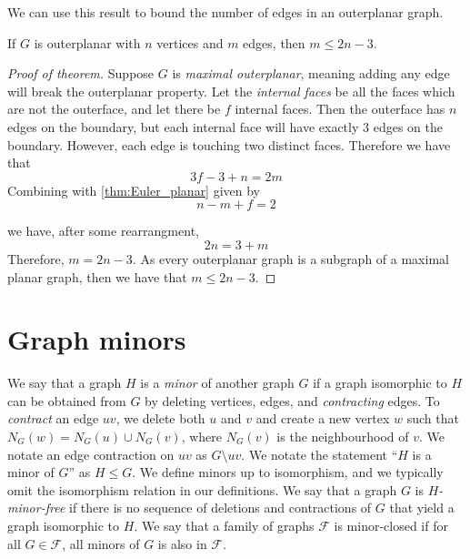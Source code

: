 We can use this result to bound the number of edges in an outerplanar graph.
\begin{theorem}\label{thm:outerplanar_bound}
	If $G$ is outerplanar with $n$ vertices and $m$ edges, then $m \leq 2n - 3$.
\end{theorem}

\begin{proof}[Proof of theorem]
	Suppose $G$ is \textit{maximal outerplanar}, meaning adding any edge will break the outerplanar property. Let the \textit{internal faces} be all the faces which are not the outerface, and let there be $f$ internal faces. Then the outerface has $n$ edges on the boundary, but each internal face will have exactly $3$ edges on the boundary. However, each edge is touching two distinct faces. Therefore we have that
	\begin{equation}
		3 f - 3 + n = 2m
	\end{equation}
	Combining with \cref{thm:Euler_planar} given by
	\begin{equation}
		n - m + f = 2
	\end{equation}
	
	we have, after some rearrangment, 
	\begin{equation}
		2n = 3 + m
	\end{equation}
	Therefore, $m = 2n - 3$. As every outerplanar graph is a subgraph of a maximal planar graph, then we have that $m \leq 2n - 3$. 
\end{proof}
\section{Graph minors}\label{sec:Graph Minors}
We say that a graph $H$ is a \textit{minor} of another graph $G$ if a graph isomorphic to $H$ can be obtained from $G$ by deleting vertices, edges, and \textit{contracting} edges. To \textit{contract} an edge $uv$, we delete both $u$ and $v$ and create a new vertex $w$ such that $N_G(w) = N_G(u) \cup N_G(v)$, where $N_G(v)$ is the neighbourhood of $v$. We notate an edge contraction on $uv$ as $G\setminus uv$.
We notate the statement ``$H$ is a minor of $G$'' as $H \leq G$. 
We define minors up to isomorphism, and we typically omit the isomorphism relation in our definitions. We say that a graph $G$ is \textit{$H$-minor-free} if there is no sequence of deletions and contractions of $G$ that yield a graph isomorphic to $H$. We say that a family of graphs $\mathcal{F}$ is minor-closed if for all $G \in \mathcal{F}$, all minors of $G$ is also in $\mathcal{F}$. 

